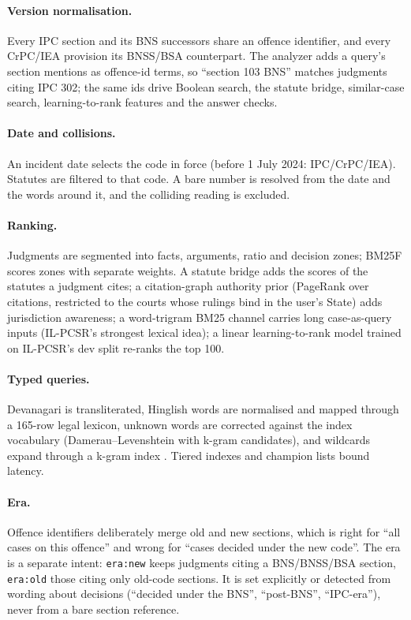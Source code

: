\documentclass[sigconf,nonacm]{acmart}
\begin{document}
\paragraph{Version normalisation.} Every IPC section and its BNS successors share an offence
identifier, and every CrPC/IEA provision its BNSS/BSA counterpart. The analyzer adds a query's
section mentions as offence-id terms, so ``section 103 BNS'' matches judgments citing IPC 302; the
same ids drive Boolean search, the statute bridge, similar-case search, learning-to-rank features
and the answer checks.
\paragraph{Date and collisions.} An incident date selects the code in force (before 1 July 2024:
IPC/CrPC/IEA). Statutes are filtered to that code. A bare number is resolved from the date and the
words around it, and the colliding reading is excluded.
\paragraph{Ranking.} Judgments are segmented into facts, arguments, ratio and decision zones; BM25F
\cite{bm25f} scores zones with separate weights. A statute bridge adds the scores of the statutes a
judgment cites; a citation-graph authority prior (PageRank over citations, restricted to the courts
whose rulings bind in the user's State) adds jurisdiction awareness; a word-trigram BM25 channel
carries long case-as-query inputs (IL-PCSR's strongest lexical idea); a linear learning-to-rank
model \cite{liu2009ltr} trained on IL-PCSR's dev split re-ranks the top 100.
\paragraph{Typed queries.} Devanagari is transliterated, Hinglish words are normalised and mapped
through a 165-row legal lexicon, unknown words are corrected against the index vocabulary
(Damerau--Levenshtein with k-gram candidates), and wildcards expand through a k-gram index
\cite{iir}. Tiered indexes and champion lists bound latency.
\paragraph{Era.} Offence identifiers deliberately merge old and new sections, which is right for
``all cases on this offence'' and wrong for ``cases decided under the new code''. The era is a
separate intent: \texttt{era:new} keeps judgments citing a BNS/BNSS/BSA section, \texttt{era:old}
those citing only old-code sections. It is set explicitly or detected from wording about decisions
(``decided under the BNS'', ``post-BNS'', ``IPC-era''), never from a bare section reference.
\end{document}
